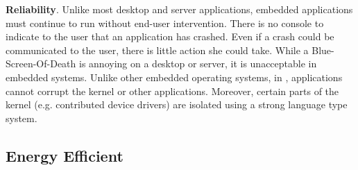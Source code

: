 {\bf Reliability}. Unlike most desktop and server applications, embedded
applications must continue to run without end-user intervention. There is no
console to indicate to the user that an application has crashed. Even if a crash
could be communicated to the user, there is little action she could take. While
a Blue-Screen-Of-Death is annoying on a desktop or server, it is unacceptable in
embedded systems. Unlike other embedded operating systems, in \name,
applications cannot corrupt the kernel or other applications. Moreover, certain
parts of the kernel (e.g. contributed device drivers) are isolated using
a strong language type system.

\subsection{Energy Efficient}



